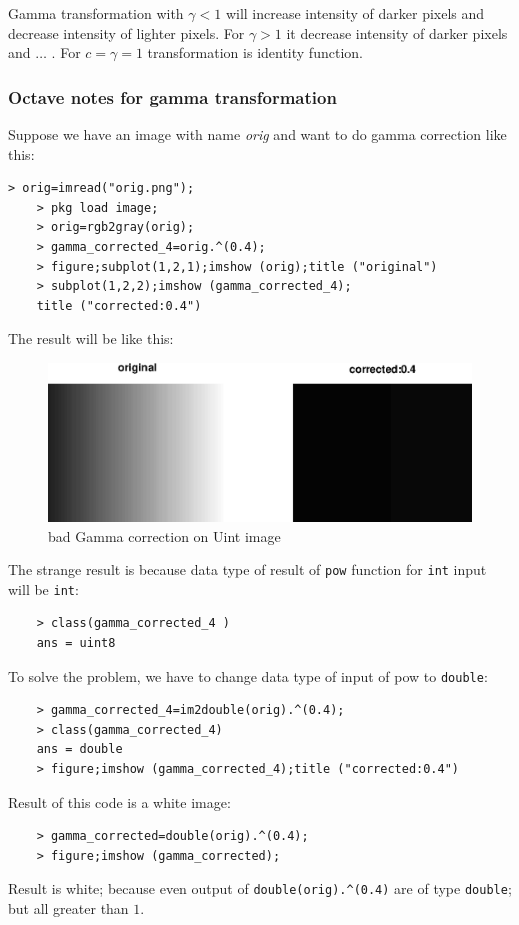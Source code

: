 Gamma transformation with $\gamma < 1$ will increase intensity of darker pixels 
and decrease intensity of lighter pixels. For $\gamma > 1$ it decrease 
intensity of darker pixels and $\dots$ . For $c = \gamma = 1$ transformation is 
identity function.

\subsubsection{Octave notes for gamma transformation}

Suppose we have an image with name \emph{orig} and want to do gamma correction 
like this:

\begin{Verbatim}[frame=single,label=Octave lab:\ bad Gamma correction on Uint image]
    > orig=imread("orig.png");
    > pkg load image;
    > orig=rgb2gray(orig);
    > gamma_corrected_4=orig.^(0.4);
    > figure;subplot(1,2,1);imshow (orig);title ("original")
    > subplot(1,2,2);imshow (gamma_corrected_4);
    title ("corrected:0.4") 
\end{Verbatim}

The result will be like this:

\begin{figure}[htb!]
    \includegraphics[scale=0.4]{bad_Gamma_correction_on_Uint_image.eps}
    \centering
    \caption{bad Gamma correction on Uint image}
    \label{fig:bad_Gamma_correction_on_Uint_image}
\end{figure}

The strange result is because data type of result of \texttt{pow} function for 
\texttt{int} input will be \texttt{int}:
\begin{Verbatim}
    > class(gamma_corrected_4 )
    ans = uint8
\end{Verbatim}
To solve the problem, we have to change data type of input of pow to 
\texttt{double}:
\begin{Verbatim}
    > gamma_corrected_4=im2double(orig).^(0.4);
    > class(gamma_corrected_4)
    ans = double
    > figure;imshow (gamma_corrected_4);title ("corrected:0.4")
\end{Verbatim}
Result of this code is a white image:
\begin{Verbatim}
    > gamma_corrected=double(orig).^(0.4);
    > figure;imshow (gamma_corrected);
\end{Verbatim}
Result is white; because even output of \texttt{double(orig).\string^(0.4)} 
are of type \texttt{double}; but all greater than $1$.

